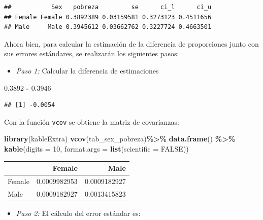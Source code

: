 \documentclass[
  spanish,
  12pt,
]{book}
\newenvironment{Shaded}{\begin{snugshade}}{\end{snugshade}}
\newcommand{\AttributeTok}[1]{\textcolor[rgb]{0.13,0.29,0.53}{#1}}
\newcommand{\ConstantTok}[1]{\textcolor[rgb]{0.56,0.35,0.01}{#1}}
\newcommand{\DecValTok}[1]{\textcolor[rgb]{0.00,0.00,0.81}{#1}}
\newcommand{\FloatTok}[1]{\textcolor[rgb]{0.00,0.00,0.81}{#1}}
\newcommand{\FunctionTok}[1]{\textcolor[rgb]{0.13,0.29,0.53}{\textbf{#1}}}
\newcommand{\NormalTok}[1]{#1}
\newcommand{\SpecialCharTok}[1]{\textcolor[rgb]{0.81,0.36,0.00}{\textbf{#1}}}
\providecommand{\tightlist}{%
  \setlength{\itemsep}{0pt}\setlength{\parskip}{0pt}}
\begin{document}
\begin{verbatim}
##           Sex   pobreza         se      ci_l      ci_u
## Female Female 0.3892389 0.03159581 0.3273123 0.4511656
## Male     Male 0.3945612 0.03662762 0.3227724 0.4663501
\end{verbatim}

Ahora bien, para calcular la estimación de la diferencia de proporciones junto con sus errores estándares, se realizarán los siguientes pasos:

\begin{itemize}
\tightlist
\item
  \emph{Paso 1:} Calcular la diferencia de estimaciones
\end{itemize}

\begin{Shaded}
\begin{Highlighting}[]
\FloatTok{0.3892} \SpecialCharTok{{-}} \FloatTok{0.3946}          
\end{Highlighting}
\end{Shaded}

\begin{verbatim}
## [1] -0.0054
\end{verbatim}

Con la función \texttt{vcov} se obtiene la matriz de covarianzas:

\begin{Shaded}
\begin{Highlighting}[]
\FunctionTok{library}\NormalTok{(kableExtra)}
\FunctionTok{vcov}\NormalTok{(tab\_sex\_pobreza)}\SpecialCharTok{\%\textgreater{}\%} \FunctionTok{data.frame}\NormalTok{() }\SpecialCharTok{\%\textgreater{}\%} 
  \FunctionTok{kable}\NormalTok{(}\AttributeTok{digits =} \DecValTok{10}\NormalTok{,}
        \AttributeTok{format.args =} \FunctionTok{list}\NormalTok{(}\AttributeTok{scientific =} \ConstantTok{FALSE}\NormalTok{))}
\end{Highlighting}
\end{Shaded}

\begin{tabular}{l|r|r}
\hline
  & Female & Male\\
\hline
Female & 0.0009982953 & 0.0009182927\\
\hline
Male & 0.0009182927 & 0.0013415823\\
\hline
\end{tabular}

\begin{itemize}
\tightlist
\item
  \emph{Paso 2:} El cálculo del error estándar es:
\end{itemize}
\end{document}
